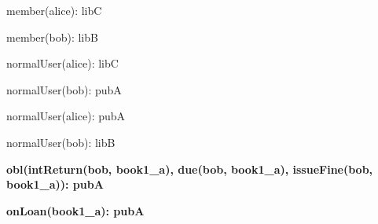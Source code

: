 \documentclass{article}
\begin{document}
{\begin{minipage}{\tableWidth}
\begin{description}[align=left,leftmargin=1em,noitemsep,labelsep=\parindent]
\item{{member(\allowbreak{}alice): libC}}
\item{{member(\allowbreak{}bob): libB}}
\item{{normalUser(\allowbreak{}alice): libC}}
\item{{normalUser(\allowbreak{}bob): pubA}}
\item{{normalUser(\allowbreak{}alice): pubA}}
\item{{normalUser(\allowbreak{}bob): libB}}
\item\textbf{{obl(\allowbreak{}intReturn(\allowbreak{}bob, book1\_a), due(\allowbreak{}bob, book1\_a), issueFine(\allowbreak{}bob, book1\_a)): pubA}}
\item\textbf{{onLoan(\allowbreak{}book1\_a): pubA}}
\end{description}\end{minipage}}
\end{document}
